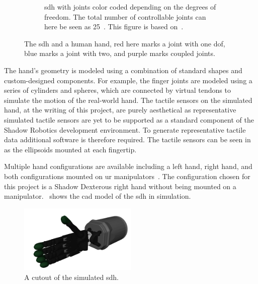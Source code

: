 \begin{figure}[h]
\begin{subfigure}[b]{0.48\textwidth}
		\caption{\gls{sdh} with joints color coded depending on the degrees of freedom. The total number of controllable joints can here be seen as \num{25}~\cite{design-and-development-of-a-bilateral-therapeutic-hand-device-for-stroke-rehabilitation}. This figure is based on~\cite{svg-skeleton-hand}.}
		\label{fig:human-hand-skeleton}
	\end{subfigure}
	\caption{The \gls{sdh} and a human hand, red here marks a joint with one \gls{dof}, blue marks a joint with two, and purple marks coupled joints.}
	\label{fig:hands-dof}
\end{figure}

The hand's geometry is modeled using a combination of standard shapes and custom-designed components. For example, the finger joints are modeled using a series of cylinders and spheres, which are connected by virtual tendons to simulate the motion of the real-world hand. The tactile sensors on the simulated hand, at the writing of this project, are purely aesthetical as representative simulated tactile sensors are yet to be supported as a standard component of the Shadow Robotics development environment. To generate representative tactile data additional software is therefore required. The tactile sensors can be seen in  as the ellipsoids mounted at each fingertip. \medskip

Multiple hand configurations are available including a left hand, right hand, and both configurations mounted on \gls{ur} manipulators~\cite{shadow-hand-configurations}. The configuration chosen for this project is a Shadow Dexterous right hand without being mounted on a manipulator.~ shows the \gls{cad} model of the \gls{sdh} in simulation.

\begin{figure}[h]
	\begin{small}
		\begin{center}
			\includegraphics[width=0.5\textwidth]{chapters/system-setup/fig/simulation-robot-hand.png}
		\end{center}
		\caption{A cutout of the simulated \gls{sdh}.}
		\label{fig:simulated-robot-hand}
	\end{small}
\end{figure}
\newpage
